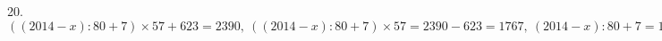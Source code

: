 20. $((2014-x):80+7)\times57+623=2390,\ ((2014-x):80+7)\times57=2390-623=1767,\ (2014-x):80+7=1767:57=31,\ (2014-x):80=31-7=24,\ 2014-x=24\cdot80=1920, x=2014-1920=94.$\\
